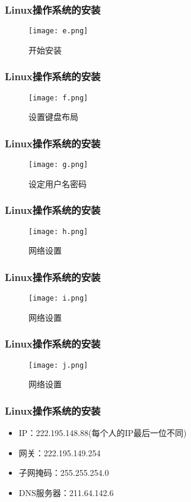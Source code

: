 \documentclass[notheorems,mathserif,table,compress]{beamer}  %
\begin{document}
\begin{frame}
  \frametitle{Linux操作系统的安装}  
  \begin{figure}[!ht]
  \centering\texttt{[image: e.png]}
  \label{fig:5}
  \caption{开始安装}
  \end{figure}
\end{frame}

\begin{frame}
  \frametitle{Linux操作系统的安装}  
  \begin{figure}[!ht]
  \centering\texttt{[image: f.png]}
  \label{fig:6}
  \caption{设置键盘布局}
  \end{figure}
\end{frame}

\begin{frame}
  \frametitle{Linux操作系统的安装}  
  \begin{figure}[!ht]
  \centering\texttt{[image: g.png]}
  \caption{设定用户名密码} 
  \label{fig:7}
  \end{figure}
\end{frame}

\begin{frame}
  \frametitle{Linux操作系统的安装}  
  \begin{figure}[!ht]
  \centering\texttt{[image: h.png]}
  \caption{网络设置}
  \label{fig:8}
  \end{figure}
\end{frame}

\begin{frame}
  \frametitle{Linux操作系统的安装}  
  \begin{figure}[!ht]
  \centering\texttt{[image: i.png]}
  \caption{网络设置}
  \label{fig:9}
  \end{figure}
\end{frame}

\begin{frame}
  \frametitle{Linux操作系统的安装}  
  \begin{figure}[!ht]
  \centering\texttt{[image: j.png]}
  \caption{网络设置}
  \label{fig:10}
  \end{figure} 
\end{frame}

\begin{frame}
  \frametitle{Linux操作系统的安装}  
  \begin{itemize}
  \item IP：222.195.148.88(每个人的IP最后一位不同)
  \item 网关：222.195.149.254
  \item 子网掩码：255.255.254.0
  \item DNS服务器：211.64.142.6
  \end{itemize}
\end{frame}
\end{document}
